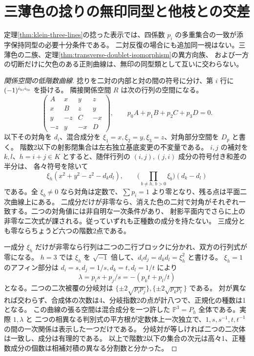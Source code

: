 \section{三薄色の捻りの無印同型と他枝との交差}
\label{sec:three-lines-twisted-isomorphism}
\begin{theorem}
定理\ref{thm:klein-three-lines}の捻った表示では、四係数 $p_i$ の多重集合の一致が添字保持同型の必要十分条件である。
二対反復の場合にも追加同一視はない。三薄色の二族、定理\ref{thm:transverse-doublet-isomorphism}の異方向族、
および一方の切断だけに欠色のある正則曲線は、無印の同型類として互いに交わらない。
\end{theorem}
\begin{proof}[関係空間の低階数曲線]
捻りを二対の内部と対の間の符号に分け、第 $i$ 行に $(-1)^{i_{\rm hi}i_{\rm lo}}$ を掛ける。
隣接関係空間 $R$ は次の行列の空間になる。
\[
 \begin{pmatrix}A&x&y&z\\x&B&z&y\\y&-z&C&-x\\-z&y&-x&D\end{pmatrix},
 \qquad p_0 A+p_1 B+p_2 C+p_3 D=0 .
\]
以下その対角を $d_i$、混合成分を $\xi_1=x,\xi_2=y,\xi_3=z$、対角部分空間を $D_p$ と書く。
階数2以下の射影閉集合は左右独立基底変更の不変量である。
$i,j$ の補対を $k,l$、$h=i+j\in K$ とすると、随伴行列の $(i,j),(j,i)$ 成分の符号付き和差の半分は、
各々符号を除いて
\[
 \xi_h(x^2+y^2-z^2-d_kd_l),\qquad
 \Big(\prod_{b\ne h,\, b>0}\xi_b\Big)(d_k-d_l)
\]
である。全 $\xi_b\ne0$ なら対角は定数で、$\sum p_i=1$ より零となり、残る点は平面二次曲線上にある。
二成分だけが非零なら、消えた色の二対で対角がそれぞれ一致する。二つの対角値には非自明な一次条件があり、
射影平面内でさらに上の非零な二次式が課される。従っていずれも正種数の成分を持たない。
三成分とも零ならちょうど六つの階数2点である。

一成分 $\xi_h$ だけが非零なら行列は二つの二行ブロックに分かれ、双方の行列式が零になる。
$h=3$ では $\xi_h$ を $\sqrt{-1}$ 倍して、$d_i d_j=d_kd_l=\xi_h^2$ と書ける。
$\xi_h=1$ のアフィン部分は $d_i=s,d_j=1/s,d_k=t,d_l=1/t$ により
\[
 \lambda=p_i s+p_j/s=-(p_k t+p_l/t)
\]
となる。二つの二次被覆の分岐対は $\{\pm 2\sqrt{p_i p_j}\},\{\pm 2\sqrt{p_k p_l}\}$ である。
対が異なれば交わらず、合成体の次数は4、分岐指数2の点が計八つで、正規化の種数は1となる。
この曲線の張る空間は混合成分を一つ許した $\mathbb P^3=P_h$ 全体である。実際 $1,\lambda$ と
二つの相異なる判別式の平方根が定数体上一次独立で、$1,s,s^{-1},t,t^{-1}$ の間の一次関係は表示した一つだけである。
分岐対が等しければ二つの二次体は一致し、成分は有理的である。
以上で階数2以下の集合の次元は高々1、正種数成分の個数は相補対積の異なる分割数と分かった。
\end{proof}

